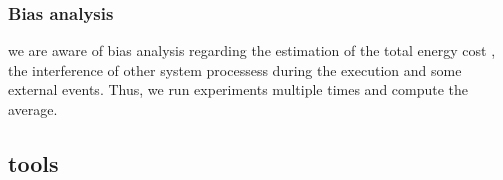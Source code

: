 


\subsubsection{Bias analysis}
we are aware of bias analysis regarding the estimation of the total energy cost , the interference of other system processess during the execution and some external events. Thus, we run experiments multiple times and compute the average.

\subsection{tools }
